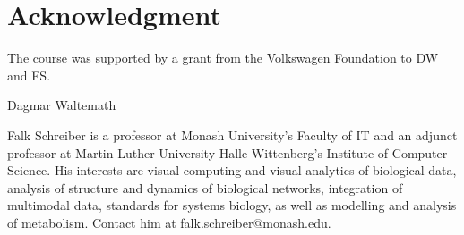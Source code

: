\documentclass[journal,transmag]{IEEEtran}
\begin{document}
\section*{Acknowledgment}
The course was supported by a grant from the Volkswagen Foundation to DW and FS. 

\ifCLASSOPTIONcaptionsoff
  \newpage
\fi




% 

\begin{IEEEbiography}{Dagmar Waltemath}
\end{IEEEbiography}

\begin{IEEEbiography}{Falk Schreiber}
 is a professor at Monash University's Faculty of IT and an adjunct professor at Martin Luther University Halle-Wittenberg's Institute of Computer Science. His interests are visual computing and visual analytics of biological data, analysis of structure and dynamics of biological networks, integration of multimodal data, standards for systems biology, as well as modelling and analysis of metabolism.
Contact him at falk.schreiber@monash.edu.
\end{IEEEbiography}
\end{document}
